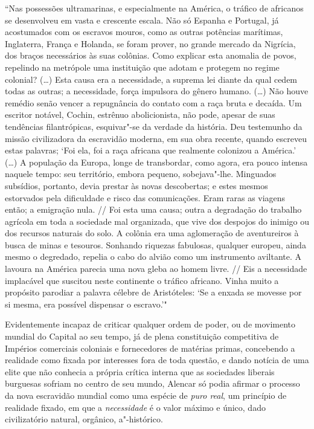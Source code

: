 ``Nas possessões ultramarinas, e especialmente na América, o tráfico de
africanos se desenvolveu em vasta e crescente escala. Não só Espanha e
Portugal, já acostumados com os escravos mouros, como as outras
potências marítimas, Inglaterra, França e Holanda, se foram prover, no
grande mercado da Nigrícia, dos braços necessários às suas colônias.
Como explicar esta anomalia de povos, repelindo na metrópole uma
instituição que adotam e protegem no regime colonial? (\ldots{}) Esta causa
era a necessidade, a suprema lei diante da qual cedem todas as outras; a
necessidade, força impulsora do gênero humano. (\ldots{}) Não houve remédio
senão vencer a repugnância do contato com a raça bruta e decaída. Um
escritor notável, Cochin, estrênuo abolicionista, não pode, apesar de
suas tendências filantrópicas, esquivar"-se da verdade da história. Deu
testemunho da missão civilizadora da escravidão moderna, em sua obra
recente, quando escreveu estas palavras; `Foi ela, foi a raça africana
que realmente colonizou a América.' (\ldots{}) A população da Europa, longe
de transbordar, como agora, era pouco intensa naquele tempo: seu
território, embora pequeno, sobejava"-lhe. Minguados subsídios, portanto,
devia prestar às novas descobertas; e estes mesmos estorvados pela
dificuldade e risco das comunicações. Eram raras as viagens então; a
emigração nula. // Foi esta uma causa; outra a degradação do trabalho
agrícola em toda a sociedade mal organizada, que vive dos despojos do
inimigo ou dos recursos naturais do solo. A colônia era uma aglomeração
de aventureiros à busca de minas e tesouros. Sonhando riquezas
fabulosas, qualquer europeu, ainda mesmo o degredado, repelia o cabo do
alvião como um instrumento aviltante. A lavoura na América parecia uma
nova gleba ao homem livre. // Eis a necessidade implacável que suscitou
neste continente o tráfico africano. Vinha muito a propósito parodiar a
palavra célebre de Aristóteles: `Se a enxada se movesse por si mesma,
era possível dispensar o escravo.'"

Evidentemente incapaz de criticar qualquer ordem de poder, ou de
movimento mundial do Capital ao seu tempo, já de plena constituição
competitiva de Impérios comerciais coloniais e fornecedores de matérias
primas, concebendo a realidade como fixada por interesses fora de toda
questão, e dando notícia de uma elite que não conhecia a própria crítica
interna que as sociedades liberais burguesas sofriam no centro de seu
mundo, Alencar só podia afirmar o processo da nova escravidão mundial
como uma espécie de \emph{puro real}, um princípio de realidade fixado,
em que a \emph{necessidade} é o valor máximo e único, dado civilizatório
natural, orgânico, a"-histórico.

